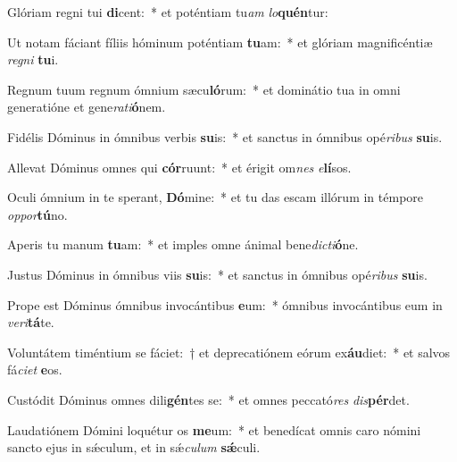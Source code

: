 \item Glóriam regni tui \textbf{di}cent:~* et poténtiam tu\textit{am} \textit{lo}\textbf{quén}tur:
\item Ut notam fáciant fíliis hóminum poténtiam \textbf{tu}am:~* et glóriam magnificéntiæ \textit{re}\textit{gni} \textbf{tu}i.
\item Regnum tuum regnum ómnium sæcu\textbf{ló}rum:~* et dominátio tua in omni generatióne et gene\textit{ra}\textit{ti}\textbf{ó}nem.
\item Fidélis Dóminus in ómnibus verbis \textbf{su}is:~* et sanctus in ómnibus opé\textit{ri}\textit{bus} \textbf{su}is.
\item Allevat Dóminus omnes qui \textbf{cór}ruunt:~* et érigit om\textit{nes} \textit{e}\textbf{lí}sos.
\item Oculi ómnium in te sperant, \textbf{Dó}mine:~* et tu das escam illórum in témpore \textit{op}\textit{por}\textbf{tú}no.
\item Aperis tu manum \textbf{tu}am:~* et imples omne ánimal bene\textit{dic}\textit{ti}\textbf{ó}ne.
\item Justus Dóminus in ómnibus viis \textbf{su}is:~* et sanctus in ómnibus opé\textit{ri}\textit{bus} \textbf{su}is.
\item Prope est Dóminus ómnibus invocántibus \textbf{e}um:~* ómnibus invocántibus eum in \textit{ve}\textit{ri}\textbf{tá}te.
\item Voluntátem timéntium se fáciet:~† et deprecatiónem eórum ex\textbf{áu}diet:~* et salvos fá\textit{ci}\textit{et} \textbf{e}os.
\item Custódit Dóminus omnes dili\textbf{gén}tes se:~* et omnes peccató\textit{res} \textit{dis}\textbf{pér}det.
\item Laudatiónem Dómini loquétur os \textbf{me}um:~* et benedícat omnis caro nómini sancto ejus in sǽculum, et in sǽ\textit{cu}\textit{lum} \textbf{sǽ}culi.
